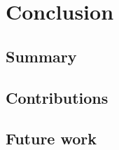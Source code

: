 \chapter{Conclusion} \label{chap:conclusion}
\section{Summary}
\section{Contributions}
\section{Future work}
